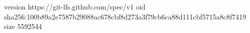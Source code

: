 version https://git-lfs.github.com/spec/v1
oid sha256:100b89a2e7587b29088ac678cbf8d273a3f79cb6ca88d111cbf5715a8c8f7419
size 5592544
